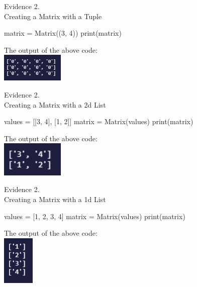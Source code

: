 \setcounter{magicrownumbers}{0}
\begin{center}
    {\large Evidence 2.\rn } \\ 
    \vspace{0.3cm}
    Creating a Matrix with a Tuple \\
    \begin{pythoncode}
matrix = Matrix((3, 4))
print(matrix)
    \end{pythoncode}
    The output of the above code: \\
    \includegraphics[width=3cm]{Images/Testing/T2.1.1.PNG} \\
    \vspace{1cm}

    {\large Evidence 2.\rn } \\ 
    \vspace{0.3cm}
    Creating a Matrix with a 2d List \\
    \begin{pythoncode}
values = [[3, 4],
        [1, 2]]
matrix = Matrix(values)
print(matrix)
    \end{pythoncode}
    The output of the above code: \\
    \includegraphics[width=3cm]{Images/Testing/T2.2.1.PNG} \\
    \vspace{1cm}

    {\large Evidence 2.\rn } \\ 
    \vspace{0.3cm}
    Creating a Matrix with a 1d List \\
    \begin{pythoncode}
values = [1, 2, 3, 4]
matrix = Matrix(values)
print(matrix)
    \end{pythoncode}
    The output of the above code: \\
    \includegraphics[width=1.5cm]{Images/Testing/T2.3.1.PNG} \\
    \vspace{1cm}


\end{center}

